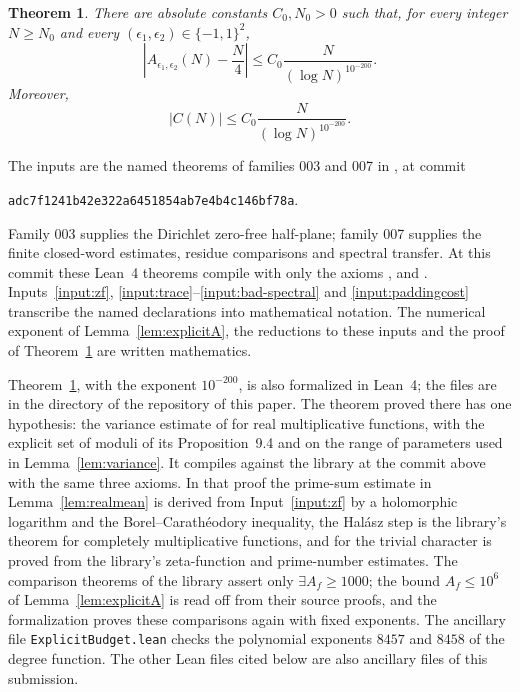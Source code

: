 \documentclass[11pt]{article}
\newtheorem{theorem}{Theorem}[section]
\theoremstyle{definition}
\newcommand{\abs}[1]{\left\lvert#1\right\rvert}
\begin{document}
\begin{theorem}\label{thm:main}
There are absolute constants $C_0,N_0>0$ such that, for every integer
$N\ge N_0$ and every $(\epsilon_1,\epsilon_2)\in\{-1,1\}^2$,
\begin{equation}\label{eq:main}
 \abs{A_{\epsilon_1,\epsilon_2}(N)-\frac N4}
 \le C_0\frac{N}{(\log N)^{10^{-200}}}.
\end{equation}
Moreover,
\begin{equation}\label{eq:correlation}
 \abs{C(N)}\le C_0\frac{N}{(\log N)^{10^{-200}}}.
\end{equation}
\end{theorem}

The inputs are the named theorems of families 003 and 007 in
\cite{OpenAIMath}, at commit
\begin{center}\small
\nolinkurl{adc7f1241b42e322a6451854ab7e4b4c146bf78a}.
\end{center}
Family 003 supplies the Dirichlet zero-free half-plane; family 007 supplies
the finite closed-word estimates, residue comparisons and spectral transfer.
At this commit these Lean~4 theorems compile with only the axioms
,  and .
Inputs~\ref{input:zf}, \ref{input:trace}--\ref{input:bad-spectral} and
\ref{input:paddingcost} transcribe the named declarations into mathematical
notation. The numerical exponent of Lemma~\ref{lem:explicitA}, the reductions
to these inputs and the proof of Theorem~\ref{thm:main} are written mathematics.

Theorem~\ref{thm:main}, with the exponent $10^{-200}$, is also formalized
in Lean~4; the files are in the directory  of the repository of
this paper.
The theorem  proved there has one
hypothesis: the variance estimate of \cite{KMT} for real multiplicative
functions, with the explicit set of moduli of its Proposition~9.4 and on
the range of parameters used in Lemma~\ref{lem:variance}.
It compiles against the library at the commit above with the same three
axioms.
In that proof the prime-sum estimate in Lemma~\ref{lem:realmean} is derived
from Input~\ref{input:zf} by a holomorphic logarithm and the
Borel--Carath\'eodory inequality, the Hal\'asz step is the library's
theorem for completely multiplicative functions, and
\cite[Lemma C.1]{MRT} for the trivial character is proved from the
library's zeta-function and prime-number estimates.
The comparison theorems of the library assert only
$\exists A_f\ge1000$; the bound $A_f\le10^6$ of
Lemma~\ref{lem:explicitA} is read off from their source proofs, and the
formalization proves these comparisons again with fixed exponents.
The ancillary file \texttt{ExplicitBudget.lean} checks the polynomial
exponents $8457$ and $8458$ of the degree function. The other Lean files
cited below are also ancillary files of this submission.
\end{document}
